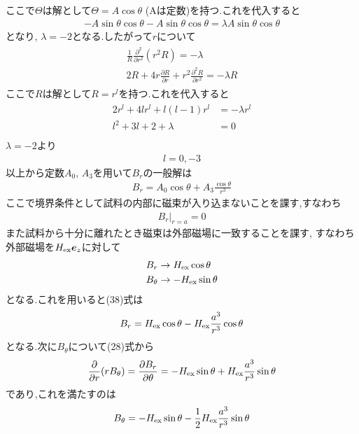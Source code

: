 \documentclass[uplatex,a4j,11pt,dvipdfmx]{jsarticle}
\begin{document}
ここで$\Theta$は解として$\Theta=A\cos\theta$ (Aは定数)を持つ.これを代入すると
\begin{align}
  -A\sin\theta\cos\theta-A\sin\theta\cos\theta=\lambda A\sin\theta\cos\theta
\end{align}
となり, $\lambda=-2$となる.したがって$r$について
\begin{align}
  \begin{split}
    \frac{1}{R}\frac{\partial^2}{\partial r^2}(r^2R)=-\lambda\\
    2R+4r\frac{\partial R}{\partial r}+r^2\frac{\partial^2R}{\partial r^2}=-\lambda R
  \end{split}
\end{align}
ここで$R$は解として$R=r^l$を持つ.これを代入すると
\begin{align}
  \begin{split}
    2r^l+4lr^l+l(l-1)r^l&=-\lambda r^l\\
    l^2+3l+2+\lambda&=0\\
  \end{split}
\end{align}
$\lambda=-2$より
\begin{align}
  l=0,-3
\end{align}
以上から定数$A_0$, $A_3$を用いて$B_r$の一般解は
\begin{align}
  B_r=A_0\cos\theta+A_3\frac{\cos\theta}{r^3}
\end{align}
ここで境界条件として試料の内部に磁束が入り込まないことを課す,すなわち
\begin{align}
  B_r|_{r=a}=0
\end{align}
また試料から十分に離れたとき磁束は外部磁場に一致することを課す,
すなわち外部磁場を$H_{\rm ex}{\bm e}_z$に対して
\begin{align}
  &B_r\rightarrow H_{\rm ex}\cos\theta\\
  &B_\theta\rightarrow-H_{\rm ex}\sin\theta
\end{align}
となる.これを用いると(38)式は
\begin{align}
  B_r=H_{\rm ex}\cos\theta-H_{\rm ex}\frac{a^3}{r^3}\cos\theta
\end{align}
となる.次に$B_\theta$について(28)式から
\begin{align}
  \frac{\partial}{\partial r}(rB_\theta)=\frac{\partial B_r}{\partial\theta}=-H_{\rm ex}\sin\theta+H_{\rm ex}\frac{a^3}{r^3}\sin\theta
\end{align}
であり,これを満たすのは
\begin{align}
  B_\theta=-H_{\rm ex}\sin\theta-\frac{1}{2}H_{\rm ex}\frac{a^3}{r^3}\sin\theta
\end{align}
\end{document}
